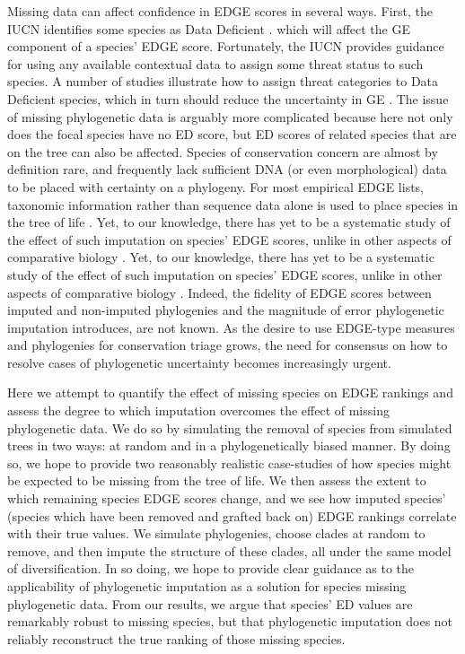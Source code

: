 \documentclass[12pt,english]{article}
\begin{document}
Missing data can affect confidence in EDGE scores in several ways. First, the
IUCN identifies some species as Data Deficient \autocite{Iucn2001, Iucn2008}.
which will affect the GE component of a species’ EDGE score. Fortunately, the
IUCN provides guidance for using any available contextual data to assign some
threat status to such species. A number of studies illustrate how to assign
threat categories to Data Deficient species, which in turn should reduce the
uncertainty in GE \autocite{Good2006, Butchart2010, Morais2013, Dulvy2014}. The
issue of missing phylogenetic data is arguably more complicated because here not
only does the focal species have no ED score, but ED scores of related species
that are on the tree can also be affected. Species of conservation concern are
almost by definition rare, and frequently lack sufficient DNA (or even
morphological) data to be placed with certainty on a phylogeny. For most
empirical EDGE lists, taxonomic information rather than sequence data alone is
used to place species in the tree of life \autocite[see]{Isaac2007, Isaac2012,
Collen2011, Jetz2014, Curnick2015, Stein2018, Gumbs2017}. Yet, to our knowledge,
there has yet to be a systematic study of the effect of such imputation on
species’ EDGE scores, unlike in other aspects of comparative biology
\autocite{Kuhn2011, Thomas2013}. Yet, to our knowledge, there has yet to be a
systematic study of the effect of such imputation on species' EDGE scores,
unlike in other aspects of comparative biology \autocite{Rabosky2014}. Indeed,
the fidelity of EDGE scores between imputed and non-imputed phylogenies and the
magnitude of error phylogenetic imputation introduces, are not known. As the
desire to use EDGE-type measures and phylogenies for conservation triage grows,
the need for consensus on how to resolve cases of phylogenetic uncertainty
becomes increasingly urgent.

Here we attempt to quantify the effect of missing species on EDGE rankings and
assess the degree to which imputation overcomes the effect of missing
phylogenetic data. We do so by simulating the removal of species from simulated
trees in two ways: at random and in a phylogenetically biased manner. By doing
so, we hope to provide two reasonably realistic case-studies of how species
might be expected to be missing from the tree of life. We then assess the extent
to which remaining species EDGE scores change, and we see how imputed species’
(species which have been removed and grafted back on) EDGE rankings correlate
with their true values. We simulate phylogenies, choose clades at random to
remove, and then impute the structure of these clades, all under the same model
of diversification. In so doing, we hope to provide clear guidance as to the
applicability of phylogenetic imputation as a solution for species missing
phylogenetic data. From our results, we argue that species’ ED values are
remarkably robust to missing species, but that phylogenetic imputation does not
reliably reconstruct the true ranking of those missing species.
\end{document}
